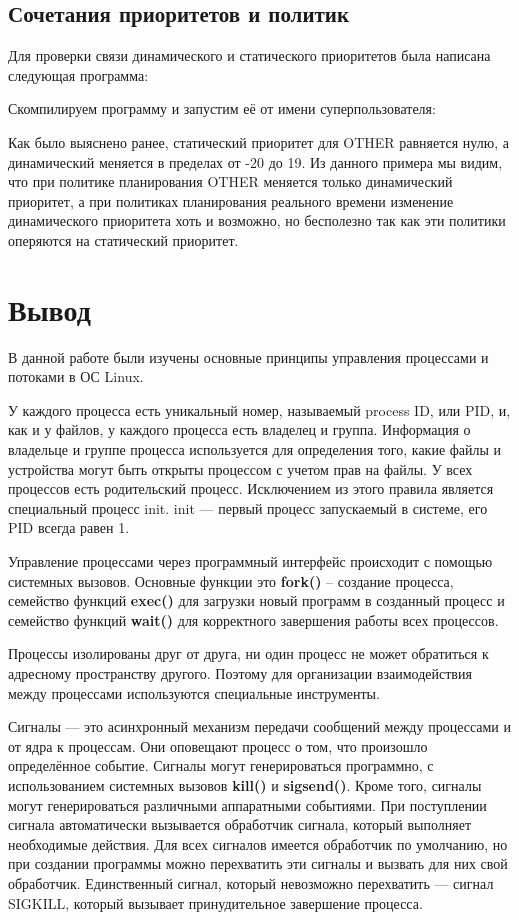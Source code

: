 \documentclass[a4paper]{article}
\begin{document}
\subsection{Сочетания приоритетов и политик}
	Для проверки связи динамического и статического приоритетов была написана следующая программа:
	
	Скомпилируем программу и запустим её от имени суперпользователя:
	
	Как было выяснено ранее, статический приоритет для OTHER равняется нулю, а динамический меняется в пределах от -20 до 19. Из данного примера мы видим, что при политике планирования OTHER меняется только динамический приоритет, а при политиках планирования реального времени изменение динамического приоритета хоть и возможно, но бесполезно так как эти политики оперяются на статический приоритет. 

\section{Вывод}
	В данной работе были изучены основные принципы управления процессами и потоками в ОС Linux. 
	
	У каждого процесса есть уникальный номер, называемый process ID, или PID, и, как и у файлов, у каждого процесса есть владелец и группа. Информация о владельце и группе процесса используется для определения того, какие файлы и устройства могут быть открыты процессом с учетом прав на файлы. У всех процессов есть родительский процесс. Исключением из этого правила является специальный процесс init. init --- первый процесс запускаемый в системе, его PID всегда равен 1.
	
	Управление процессами через программный интерфейс происходит с помощью системных вызовов. Основные функции это \textbf{fork()} -- создание процесса, семейство функций \textbf{exec()} для загрузки новый программ в созданный процесс и семейство функций \textbf{wait()} для корректного завершения работы всех процессов.
	
	Процессы изолированы друг от друга, ни один процесс не может обратиться к адресному пространству другого. Поэтому для организации взаимодействия между процессами используются специальные инструменты.
	
	Сигналы — это асинхронный механизм передачи сообщений между процессами и от ядра к процессам. Они оповещают процесс о том, что произошло определённое событие. Сигналы могут генерироваться программно, с использованием системных вызовов \textbf{kill()} и \textbf{sigsend()}. Кроме того, сигналы могут генерироваться различными аппаратными событиями.  При поступлении сигнала автоматически вызывается обработчик сигнала, который выполняет необходимые действия. Для всех сигналов имеется обработчик по умолчанию, но при создании программы можно перехватить эти сигналы и вызвать для них свой обработчик. Единственный сигнал, который невозможно перехватить --- сигнал SIGKILL, который вызывает принудительное завершение процесса.
	
\end{document}
